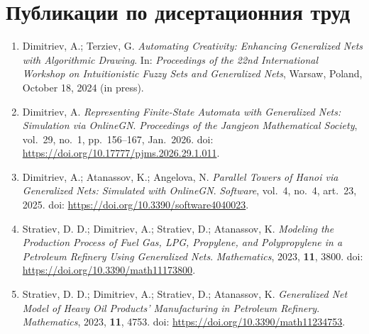 \clearpage
{}
{}
\section*{Публикации по дисертационния труд}

\begin{enumerate}[label=\arabic*.]

\item Dimitriev, A.; Terziev, G.
\newblock \emph{Automating Creativity: Enhancing Generalized Nets with Algorithmic Drawing}.
\newblock In: \emph{Proceedings of the 22nd International Workshop on Intuitionistic Fuzzy Sets and Generalized Nets}, Warsaw, Poland, October 18, 2024 (in press).

\item Dimitriev, A.
\newblock \emph{Representing Finite-State Automata with Generalized Nets: Simulation via OnlineGN}.
\newblock \emph{Proceedings of the Jangjeon Mathematical Society}, vol.~29, no.~1, pp.~156--167, Jan.~2026.
\newblock doi: \url{https://doi.org/10.17777/pjms.2026.29.1.011}.

\item Dimitriev, A.; Atanassov, K.; Angelova, N.
\newblock \emph{Parallel Towers of Hanoi via Generalized Nets: Simulated with OnlineGN}.
\newblock \emph{Software}, vol.~4, no.~4, art.~23, 2025.
\newblock doi: \url{https://doi.org/10.3390/software4040023}.

\item Stratiev, D. D.; Dimitriev, A.; Stratiev, D.; Atanassov, K.
\newblock \emph{Modeling the Production Process of Fuel Gas, LPG, Propylene, and Polypropylene in a Petroleum Refinery Using Generalized Nets}.
\newblock \emph{Mathematics}, 2023, \textbf{11}, 3800.
\newblock doi: \url{https://doi.org/10.3390/math11173800}.

\item Stratiev, D. D.; Dimitriev, A.; Stratiev, D.; Atanassov, K.
\newblock \emph{Generalized Net Model of Heavy Oil Products' Manufacturing in Petroleum Refinery}.
\newblock \emph{Mathematics}, 2023, \textbf{11}, 4753.
\newblock doi: \url{https://doi.org/10.3390/math11234753}.

\end{enumerate}